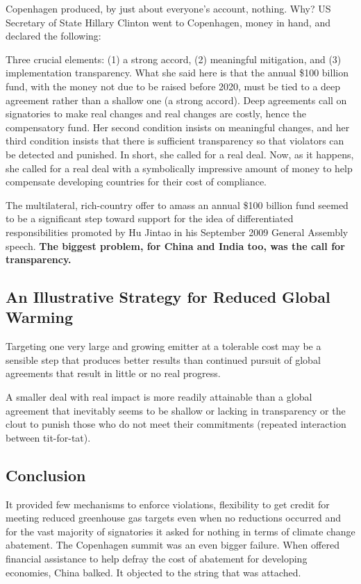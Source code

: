 Copenhagen produced, by just about everyone’s account, nothing. Why? US Secretary of State Hillary Clinton went to Copenhagen, money in hand, and declared the following:

Three crucial elements: (1) a strong accord, (2) meaningful mitigation, and (3) implementation transparency. What she said here is that the annual \$100 billion fund, with the money not due to be raised before 2020, must be tied to a deep agreement rather than a shallow one (a strong accord). Deep agreements call on signatories to make real changes and real changes are costly, hence the compensatory fund. Her second condition insists on meaningful changes, and her third condition insists that there is sufficient transparency so that violators can be detected and punished. In short, she called for a real deal. Now, as it happens, she called for a real deal with a symbolically impressive amount of money to help compensate developing countries for their cost of compliance.

The multilateral, rich-country offer to amass an annual \$100 billion fund seemed to be a significant step toward support for the idea of differentiated responsibilities promoted by Hu Jintao in his September 2009 General Assembly speech. \textbf{The biggest problem, for China and India too, was the call for transparency.}

\subsection{An Illustrative Strategy for Reduced Global Warming}

Targeting one very large and growing emitter at a tolerable cost may be a sensible step that produces better results than continued pursuit of global agreements that result in little or no real progress.

A smaller deal with real impact is more readily attainable than a global agreement that inevitably seems to be shallow or lacking in transparency or the clout to punish those who do not meet their commitments (repeated interaction between tit-for-tat).

\subsection{Conclusion}
It provided few mechanisms to enforce violations, flexibility to get credit for meeting reduced greenhouse gas targets even when no reductions occurred and for the vast majority of signatories it asked for nothing in terms of climate change abatement. The Copenhagen summit was an even bigger failure. When offered financial assistance to help defray the cost of abatement for developing economies, China balked. It objected to the string that was attached.
